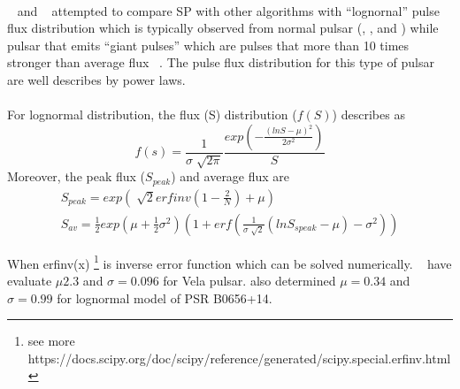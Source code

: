 \documentclass[thesis_msc.tex]{subfiles}
\begin{document}
	\paragraph{} ~\cite{keane2011transient} and ~\cite{mclaughlin2003searches} attempted to compare SP with other algorithms with ``lognornal'' pulse flux distribution which is typically observed from normal pulsar (\cite{cairns2001intrinsic}, \cite{johnston2001high}, and \cite{serylak2009simultaneous}) while pulsar that emits ``giant pulses'' which are pulses that more than 10 times stronger than average flux ~\citep{karuppusamy2010giant}. The pulse flux distribution for this type of pulsar are well describes by power laws. 
    \paragraph{} For lognormal distribution, the flux (S) distribution ($f(S)$) describes as 
    \begin{equation}
    f(s)=\frac{1}{\sigma \sqrt[]{2 \pi}} \frac{exp(-\frac{(ln S - \mu)^2}{2 \sigma^2})}{S}
    \end{equation}
    Moreover, the peak flux ($S_{peak}$) and average flux are 
    \begin{eqnarray}
     S_{peak}=exp(\sqrt[]{2} erfinv(1-\frac{2}{N})+\mu) \label{Speaklog}\\
    S_{av}=\frac{1}{2} exp(\mu+\frac{1}{2} \sigma^2) (1+erf(\frac{1}{\sigma \sqrt[]{2}} (ln S_{speak} - \mu)-\sigma^2)) \label{Savlog}
    \end{eqnarray}
   
   When erfinv(x) \footnote{see more https://docs.scipy.org/doc/scipy/reference/generated/scipy.special.erfinv.html} is inverse error function which can be solved numerically. ~\cite{cairns2001intrinsic} have evaluate $\mu 2.3$ and $\sigma = 0.096$ for Vela pulsar. \cite{weltevrede2006bright} also determined $\mu = 0.34$ and $\sigma = 0.99$ for lognormal model of PSR B0656+14. 
   
\end{document}
